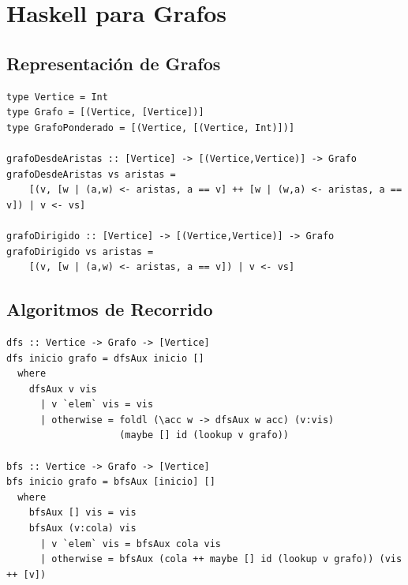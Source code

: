 \chapter{Haskell para Grafos}

\section{Representación de Grafos}

\begin{lstlisting}[caption={Representación de grafos en Haskell}]
type Vertice = Int
type Grafo = [(Vertice, [Vertice])]
type GrafoPonderado = [(Vertice, [(Vertice, Int)])]

grafoDesdeAristas :: [Vertice] -> [(Vertice,Vertice)] -> Grafo
grafoDesdeAristas vs aristas =
    [(v, [w | (a,w) <- aristas, a == v] ++ [w | (w,a) <- aristas, a == v]) | v <- vs]

grafoDirigido :: [Vertice] -> [(Vertice,Vertice)] -> Grafo
grafoDirigido vs aristas =
    [(v, [w | (a,w) <- aristas, a == v]) | v <- vs]
\end{lstlisting}

\section{Algoritmos de Recorrido}

\begin{lstlisting}[caption={DFS y BFS en Haskell}]
dfs :: Vertice -> Grafo -> [Vertice]
dfs inicio grafo = dfsAux inicio []
  where
    dfsAux v vis
      | v `elem` vis = vis
      | otherwise = foldl (\acc w -> dfsAux w acc) (v:vis)
                    (maybe [] id (lookup v grafo))

bfs :: Vertice -> Grafo -> [Vertice]
bfs inicio grafo = bfsAux [inicio] []
  where
    bfsAux [] vis = vis
    bfsAux (v:cola) vis
      | v `elem` vis = bfsAux cola vis
      | otherwise = bfsAux (cola ++ maybe [] id (lookup v grafo)) (vis ++ [v])
\end{lstlisting}